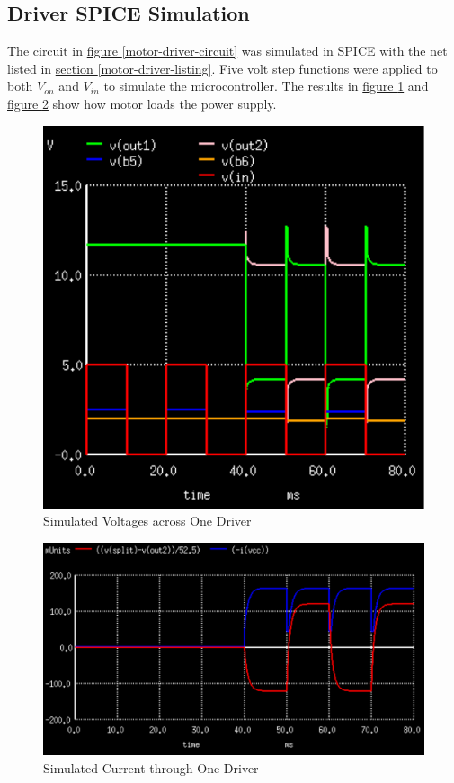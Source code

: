 \documentclass[10pt, twocolumn]{article}
\begin{document}
\subsection{Driver SPICE Simulation}

The circuit in
\hyperref[motor-driver-circuit]{figure \ref{motor-driver-circuit}}
was simulated in SPICE with the net listed in
\hyperref[motor-driver-listing]{section \ref{motor-driver-listing}}.
Five volt step functions were applied to both $V_{on}$ and $V_{in}$ to simulate the microcontroller.
The results in 
\hyperref[motor-driver-voltage-simulation]{figure \ref{motor-driver-voltage-simulation}}
and
\hyperref[motor-driver-current-simulation]{figure \ref{motor-driver-current-simulation}}
show how motor loads the power supply.

\begin{figure}
	\centering
	\includegraphics[width=0.75\columnwidth]{Figures/motor-driver-voltage-simulation.pdf}
	\caption{Simulated Voltages across One Driver}
	\label{motor-driver-voltage-simulation}
\end{figure}

\begin{figure}
	\centering
	\includegraphics[width=0.9\columnwidth]{Figures/motor-driver-current-simulation.pdf}
	\caption{Simulated Current through One Driver}
	\label{motor-driver-current-simulation}
\end{figure}
\end{document}

